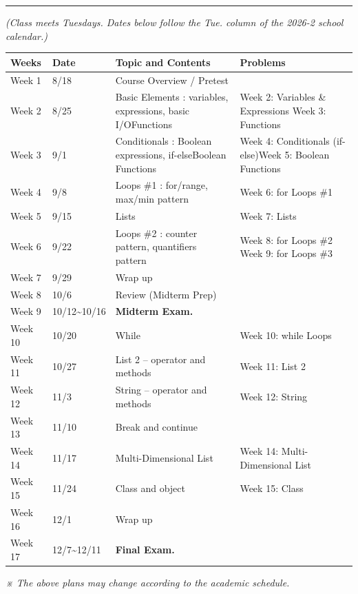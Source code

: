 \documentclass[11pt,a4paper]{article}
\newcommand{\syltitle}[1]{\vspace{4mm}\noindent{\Large\bfseries #1}\vspace{1mm}\hrule\vspace{3mm}}
\begin{document}
\clearpage

\syltitle{7. Weekly Plans}
\textit{(Class meets Tuesdays. Dates below follow the Tue. column of the 2026-2 school calendar.)}
\vspace{2mm}

{\small
\begin{tabular}{|p{1.6cm}|p{2.1cm}|p{6.6cm}|p{5.8cm}|}
\hline
\rowcolor{hdrgray}\textbf{Weeks} & \textbf{Date} & \textbf{Topic and Contents} & \textbf{Problems} \\
\hline
Week 1 & 8/18 & Course Overview / Pretest & \\
\hline
Week 2 & 8/25 & Basic Elements : variables, expressions, basic I/O\newline Functions & Week 2: Variables \& Expressions \newline Week 3: Functions \\
\hline
Week 3 & 9/1 & Conditionals : Boolean expressions, if-else\newline Boolean Functions & Week 4: Conditionals (if-else)\newline Week 5: Boolean Functions \\
\hline
Week 4 & 9/8 & Loops \#1 : for/range, max/min pattern & Week 6: for Loops \#1 \\
\hline
Week 5 & 9/15 & Lists & Week 7: Lists \\
\hline
Week 6 & 9/22 & Loops \#2 : counter pattern, quantifiers pattern & Week 8: for Loops \#2 \newline Week 9: for Loops \#3 \\
\hline
Week 7 & 9/29 & Wrap up & \\
\hline
Week 8 & 10/6 & Review (Midterm Prep) & \\
\hline
Week 9 & 10/12\textasciitilde10/16 & \textbf{Midterm Exam.} & \\
\hline
Week 10 & 10/20 & While & Week 10: while Loops \\
\hline
Week 11 & 10/27 & List 2 -- operator and methods & Week 11: List 2 \\
\hline
Week 12 & 11/3 & String -- operator and methods & Week 12: String \\
\hline
Week 13 & 11/10 & Break and continue & \\
\hline
Week 14 & 11/17 & Multi-Dimensional List & Week 14: Multi-Dimensional List \\
\hline
Week 15 & 11/24 & Class and object & Week 15: Class \\
\hline
Week 16 & 12/1 & Wrap up & \\
\hline
Week 17 & 12/7\textasciitilde12/11 & \textbf{Final Exam.} & \\
\hline
\end{tabular}
}

\vspace{2mm}
\textit{※ The above plans may change according to the academic schedule.}
\end{document}
